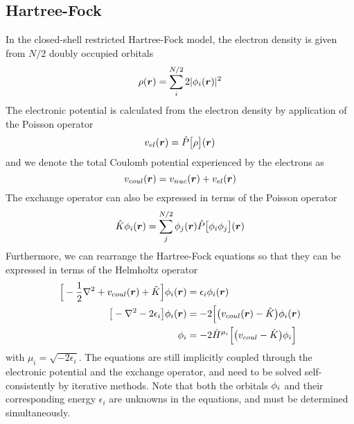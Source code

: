 \subsection{Hartree-Fock}
In the closed-shell restricted Hartree-Fock model, the electron density is given from
$N/2$ doubly occupied orbitals
\begin{equation}
    \rho(\boldsymbol r) = \sum_i^{N/2} 2 |\phi_i(\boldsymbol r)|^2
\end{equation}
The electronic potential is calculated from the electron density by application of the 
Poisson operator
\begin{equation}
    v_{el}(\boldsymbol r) = \hat{P}\big[\rho\big](\boldsymbol r)
\end{equation}
and we denote the total Coulomb potential experienced by the electrons as
\begin{equation}
    v_{coul}(\boldsymbol r) = v_{nuc}(\boldsymbol r) + v_{el}(\boldsymbol r)
\end{equation}
The exchange operator can also be expressed in terms of the Poisson operator
\begin{equation}
    \hat{K}\phi_i(\boldsymbol r) = \sum_j^{N/2} \phi_j(\boldsymbol r) 
	\hat{P}\big[\phi_i\phi_j\big](\boldsymbol r)
\end{equation}
Furthermore, we can rearrange the Hartree-Fock equations so that they can be expressed in 
terms of the Helmholtz operator
\begin{align}
    \Big[-\frac{1}{2}\nabla^2+v_{coul}(\boldsymbol r)+\hat{K}\Big]\phi_i(\boldsymbol r) 
	    &= \epsilon_i \phi_i(\boldsymbol r)\\
    \big[-\nabla^2 - 2\epsilon_i\big]\phi_i(\boldsymbol r) 
	    &= -2\Big[\big(v_{coul}(\boldsymbol r)-\hat{K}\big)\phi_i(\boldsymbol r)\\
    \phi_i &= -2\hat{H}^{\mu_i}\Big[\big(v_{coul} - \hat{K}\big) \phi_i\Big]
\end{align}
with $\mu_i = \sqrt{-2\epsilon_i}$. The equations are still implicitly coupled through the 
electronic potential and the exchange operator, and need to be solved self-consistently by 
iterative methods. Note that both the orbitals $\phi_i$ and their corresponding energy 
$\epsilon_i$ are unknowns in the equations, and must be determined simultaneously.


